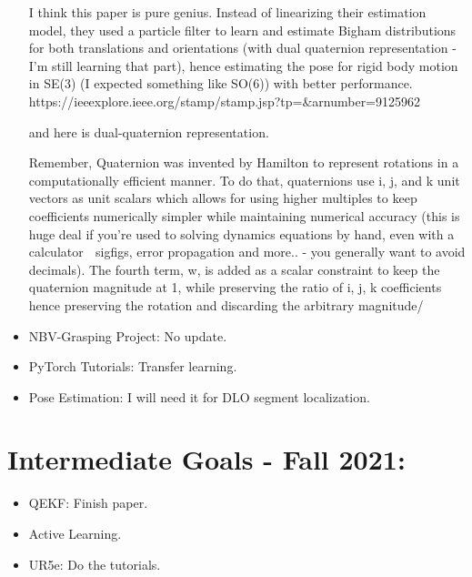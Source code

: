 \documentclass[11pt]{article}
\begin{document}
\begin{itemize}
      I think this paper is pure genius. Instead of linearizing their estimation model, they used a particle filter to learn and estimate Bigham distributions for both translations and orientations (with dual quaternion representation - I'm still learning that part), hence estimating the pose for rigid body motion in  SE(3) (I expected something like SO(6)) with better performance.
      https://ieeexplore.ieee.org/stamp/stamp.jsp?tp=&arnumber=9125962


      and here is dual-quaternion representation.

Remember, Quaternion was invented by Hamilton to represent rotations in a computationally efficient manner. To do that, quaternions use i, j, and k unit vectors as unit scalars which allows for using higher multiples to keep coefficients numerically simpler while maintaining numerical accuracy (this is huge deal if you're used to solving dynamics equations by hand, even with a calculator 🙂 sigfigs, error propagation and more.. - you generally want to avoid decimals). The fourth term, w, is added as a scalar constraint to keep the quaternion magnitude at 1, while preserving the ratio of i, j, k coefficients hence preserving the rotation and discarding the arbitrary magnitude/


      \item NBV-Grasping Project: No update.
      \item PyTorch Tutorials: Transfer learning.
      \item Pose Estimation: I will need it for DLO segment localization.

\end{itemize}


\section{Intermediate Goals - Fall 2021:}
\begin{itemize}
      \item QEKF: Finish paper.
      \item Active Learning.
      \item UR5e: Do the tutorials.
\end{itemize}


\newpage


\end{document}
